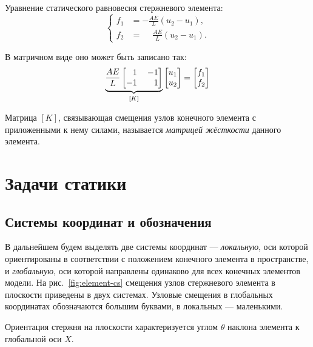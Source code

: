 \documentclass[10pt]{article}
\numberwithin{equation}{section}
\newcommand{\neword}{\emph}
\newcommand{\matr}[1]{[#1]}
\newcommand{\figref}[1]{рис. \ref{#1}}
\newcommand{\mm}{\llap{$-$}}
\newcommand{\phm}{\phantom{-}}
\begin{document}
Уравнение статического равновесия стержневого элемента:
\begin{equation}
  \begin{cases}
    f_1 &= -\frac{AE}{L}(u_2-u_1),\\
    f_2 &= \phm\frac{AE}{L}(u_2-u_1).
  \end{cases}
\end{equation}

В матричном виде оно может быть записано так:
\begin{equation}
  \label{eq:bar-equil}
  \underbrace{
  \frac{AE}{L}
  \begin{bmatrix}
    \phm{}1 && \mm1\\
    -1 && 1
  \end{bmatrix}}_{\matr{K}}
  \begin{bmatrix}
    u_1\\
    u_2
  \end{bmatrix}
  =
  \begin{bmatrix}
    f_1\\
    f_2
  \end{bmatrix}
\end{equation}

Матрица $\matr{K}$, связывающая смещения узлов конечного элемента с
приложенными к нему силами, называется \neword{матрицей жёсткости}
данного элемента.

\clearpage
\section{Задачи статики}

\subsection{Системы координат и обозначения}
\label{sec:notation}

В дальнейшем будем выделять две системы координат —
\neword{локальную}, оси которой ориентированы в соответствии с
положением конечного элемента в пространстве, и \neword{глобальную},
оси которой направлены одинаково для всех конечных элементов модели.
На \figref{fig:element-cs} смещения узлов стержневого элемента в
плоскости приведены в двух системах. Узловые смещения в глобальных
координатах обозначаются большим буквами, в локальных — маленькими.



Ориентация стержня на плоскости характеризуется углом $\theta$ наклона
элемента к глобальной оси $X$.
\end{document}
